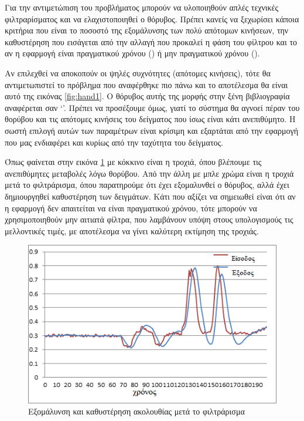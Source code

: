 Για την αντιμετώπιση του προβλήματος μπορούν να υλοποιηθούν απλές τεχνικές φιλτραρίσματος και να ελαχιστοποιηθεί ο θόρυβος. Πρέπει κανείς να ξεχωρίσει κάποια κριτήρια που είναι το ποσοστό της εξομάλυνσης των πολύ απότομων κινήσεων, την καθυστέρηση που εισάγεται από την αλλαγή που προκαλεί η φάση του φίλτρου και το αν η εφαρμογή είναι πραγματικού χρόνου () ή μην πραγματικού χρόνου ().

Αν επιλεχθεί να αποκοπούν οι ψηλές συχνότητες (απότομες κινήσεις), τότε θα αντιμετωπιστεί το πρόβλημα που αναφέρθηκε πιο πάνω και το αποτέλεσμα θα είναι αυτό της εικόνας \ref{fig:hand1}. Ο θόρυβος αυτής της μορφής στην ξένη βιβλιογραφία αναφέρεται σαν \lq {}\rq . Πρέπει να προσέξουμε όμως, γιατί το σύστημα θα αγνοεί πέραν του θορύβου και τις απότομες κινήσεις του δείγματος που ίσως είναι κάτι ανεπιθύμητο. Η σωστή επιλογή αυτών των παραμέτρων είναι κρίσιμη και εξαρτάται από την εφαρμογή που μας ενδιαφέρει και κυρίως από την ταχύτητα του δείγματος.

Όπως φαίνεται στην εικόνα \ref{fig:filter-latency} με κόκκινο είναι η τροχιά, όπου βλέπουμε τις ανεπιθύμητες μεταβολές λόγω θορύβου. Από την άλλη με μπλε χρώμα είναι η τροχιά μετά το φιλτράρισμα, όπου παρατηρούμε ότι έχει εξομαλυνθεί ο θόρυβος, αλλά έχει δημιουργηθεί καθυστέρηση των δειγμάτων. Κάτι που αξίζει να σημειωθεί είναι ότι αν η εφαρμογή δεν απαιτείται να είναι πραγματικού χρόνου, τότε μπορούν να χρησιμοποιηθούν μην αιτιατά φίλτρα, που λαμβάνουν υπόψη στους υπολογισμούς τις μελλοντικές τιμές, με αποτέλεσμα να γίνει καλύτερη εκτίμηση της τροχιάς.

\begin{figure}[h]
    \centering
    \includegraphics[width=.8\textwidth]{kinect/fig/filter-latency.png}
    \caption{Εξομάλυνση και καθυστέρηση ακολουθίας μετά το φιλτράρισμα\protect\footnotemark}
    \label{fig:filter-latency}
\end{figure}

